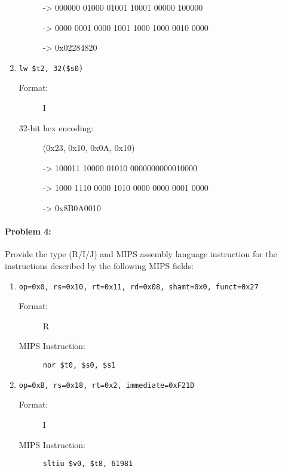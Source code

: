 \documentclass[12pt,letterpaper,titlepage]{article}
\begin{document}
\begin{raggedright}
\begin{enumerate}
\begin{description}
-> 000000 01000 01001 10001 00000 100000 

-> 0000 0001 0000 1001 1000 1000 0010 0000 

-> 0x02284820
\end{description}

\item \begin{lstlisting}
lw $t2, 32($s0)
      \end{lstlisting}
\begin{description}
\item[Format:] I
\item[32-bit hex encoding:] (0x23, 0x10, 0x0A, 0x10) 

-> 100011 10000 01010 0000000000010000

-> 1000 1110 0000 1010 0000 0000 0001 0000

-> 0x8B0A0010
\end{description}
\end{enumerate}

\clearpage

\paragraph{Problem 4: }
Provide the type (R/I/J) and MIPS assembly language instruction for the instructions described by the following MIPS fields:

\begin{enumerate}
\item \begin{lstlisting}
op=0x0, rs=0x10, rt=0x11, rd=0x08, shamt=0x0, funct=0x27
\end{lstlisting}
\begin{description}
\item[Format:] R
\item[MIPS Instruction:] 
\begin{lstlisting}
nor $t0, $s0, $s1
\end{lstlisting}
\end{description}

\item \begin{lstlisting}
op=0xB, rs=0x18, rt=0x2, immediate=0xF21D
\end{lstlisting}
\begin{description}
\item[Format:] I
\item[MIPS Instruction:] 
\begin{lstlisting}
sltiu $v0, $t8, 61981
\end{lstlisting}
\end{description}
\end{enumerate}


\end{raggedright}
\end{document}
